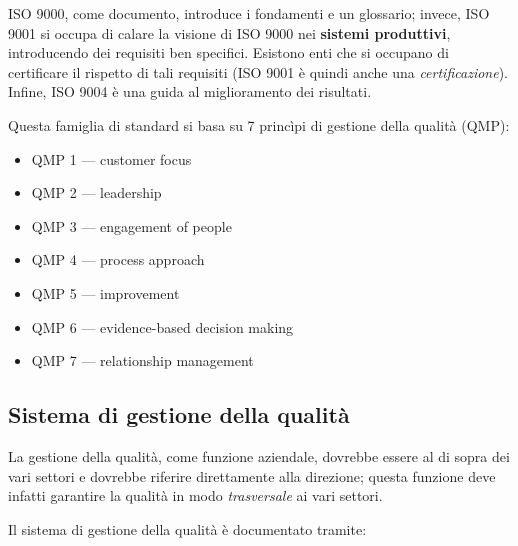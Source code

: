 \documentclass[a4paper]{article}
\begin{document}
ISO 9000, come documento, introduce i fondamenti e un glossario; invece, ISO 9001 si occupa di calare la visione di ISO 9000 nei \textbf{sistemi produttivi}, introducendo dei requisiti ben specifici. Esistono enti che si occupano di certificare il rispetto di tali requisiti (ISO 9001 è quindi anche una \emph{certificazione}). Infine, ISO 9004 è una guida al miglioramento dei risultati.
		
Questa famiglia di standard si basa su 7 princìpi di gestione della qualità (QMP):
		
	\begin{itemize}
		
			
	\item QMP 1 — customer focus
			
	\item QMP 2 — leadership
			
	\item QMP 3 — engagement of people
			
	\item QMP 4 — process approach
			
	\item QMP 5 — improvement
			
	\item QMP 6 — evidence-based decision making
			
	\item QMP 7 — relationship management
		
	\end{itemize}


		
	\subsection{Sistema di gestione della qualità}

		
La gestione della qualità, come funzione aziendale, dovrebbe essere al di sopra dei vari settori e dovrebbe riferire direttamente alla direzione; questa funzione deve infatti garantire la qualità in modo \emph{trasversale} ai vari settori.
		
Il sistema di gestione della qualità è documentato tramite:
		
\end{document}
